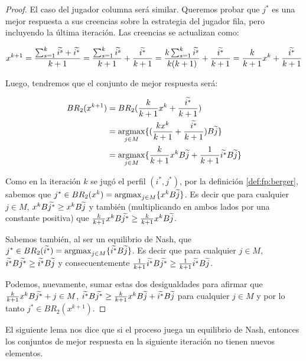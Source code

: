 \begin{proof}
    El caso del jugador columna será similar. Queremos probar que $j^*$ es una mejor respuesta a sus creencias sobre la estrategia del jugador fila, pero incluyendo la última iteración. Las creencias se actualizan como:

    \[
        x^{k+1} = \frac{\sum_{s=1}^{k}{\widetilde{i^s}} + \widetilde{i^*}}{k+1}
        = \frac{\sum_{s=1}^{k}{\widetilde{i^s}}}{k+1} + \frac{\widetilde{i^*}}{k+1}
        = \frac{k\sum_{s=1}^{k}{\widetilde{i^s}}}{k(k+1)} + \frac{\widetilde{i^*}}{k+1}
        = \frac{k}{k+1} x^{k} + \frac{\widetilde{i^*}}{k+1}
    \]


    Luego, tendremos que el conjunto de mejor respuesta será:
    
    \begin{align*}
        BR_2(x^{k+1}) &= BR_2(\frac{k}{k+1} x^{k} + \frac{\widetilde{i^*}}{k+1}) \\
        &= \operatorname*{argmax}_{j \in M} \{(\frac{kx^{k}}{k+1} + \frac{\widetilde{i^*}}{k+1})B\widetilde{j}\}\\
        &= \operatorname*{argmax}_{j \in M} \{\frac{k}{k+1}x^{k}B\widetilde{j} + \frac{1}{k+1}\widetilde{i^*}B\widetilde{j}\}
    \end{align*}

    Como en la iteración $k$ se jugó el perfil $(i^*, j^*)$, por la definición \ref{def:fp:berger}, sabemos que $j^* \in BR_2(x^{k}) = \operatorname*{argmax}_{j \in M}\{x^{k}B\widetilde{j}\}$. Es decir que para cualquier $j \in M$, $x^{k}B\widetilde{j^*} \geq x^{k}B\widetilde{j}$ y también (multiplicando en ambos lados por una constante positiva) que $\frac{k}{k+1}x^{k}B\widetilde{j^*} \geq \frac{k}{k+1}x^{k}B\widetilde{j}$.

    Sabemos también, al ser un equilibrio de Nash, que $j^* \in BR_2(\widetilde{i^*}) = \operatorname*{argmax}_{j \in M}\{\widetilde{i^*}B\widetilde{j}\}$. Es decir que para cualquier $j \in M$, $\widetilde{i^*}B\widetilde{j^*} \geq \widetilde{i^*}B\widetilde{j}$ y consecuentemente $\frac{1}{k+1}\widetilde{i^*}B\widetilde{j^*} \geq \frac{1}{k+1}\widetilde{i^*}B\widetilde{j}$.

    Podemos, nuevamente, sumar estas dos desigualdades para afirmar que $\frac{k}{k+1}x^{k}B\widetilde{j^*} + j \in M$, $\widetilde{i^*}B\widetilde{j^*} \geq \frac{k}{k+1}x^{k}B\widetilde{j} + \widetilde{i^*}B\widetilde{j}$ para cualquier $j \in M$ y por lo tanto $j^* \in BR_2(x^{k+1})$.
    
\end{proof}

El siguiente lema nos dice que si el proceso juega un equilibrio de Nash, entonces los conjuntos de mejor respuesta en la siguiente iteración no tienen nuevos elementos.


